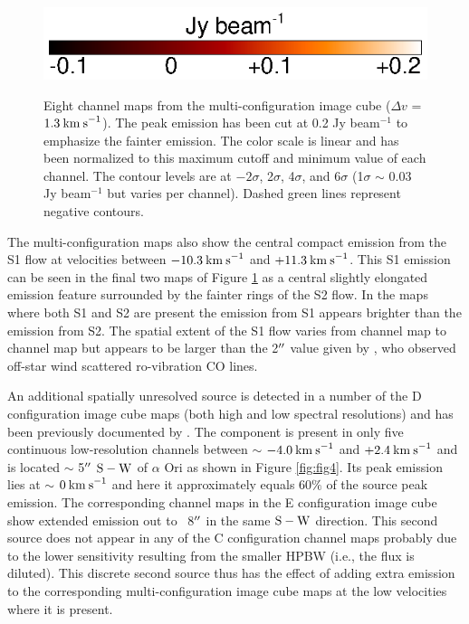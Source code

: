 \documentclass[iop]{emulateapj}
\begin{document}
\begin{figure}[hbt!]
{         }
\includegraphics[trim=0pt 20pt 0pt 5pt]{f11.ps}
\caption{Eight channel maps from the multi-configuration image cube ($\Delta v$ = $1.3\>{\rm km\>s}^{-1}$). The peak emission has been cut at 0.2 Jy beam${{}^{-1}}$ to emphasize the fainter emission. The color scale is linear and has been normalized to this maximum cutoff and minimum value of each channel. The contour levels are at $-2\sigma$, 2$\sigma$, 4$\sigma$, and 6$\sigma$ (1$\sigma$ $\sim$ 0.03 Jy beam$^{-1}$ but varies per channel). Dashed green lines represent negative contours.}
\label{fig:fig3}
\end{figure}

The multi-configuration maps also show the central compact emission from the S1 flow at velocities between $-10.3\>{\rm km\>s}^{-1}$ and $+11.3\>{\rm km\>s}^{-1}$. This S1 emission can be seen in the final two maps of Figure \ref{fig:fig3} as a central slightly elongated emission feature surrounded by the fainter rings of the S2 flow. In the maps where both S1 and S2 are present the emission from S1 appears brighter than the emission from S2. The spatial extent of the S1 flow varies from channel map to channel map but appears to be larger than the 2$\mbox{$^{\prime\prime}$}$ value given by \cite{2009AJ....137.3558S}, who observed off-star wind scattered ro-vibration CO lines. 

An additional spatially unresolved source is detected in a number of the D configuration image cube maps (both high and low spectral resolutions) and has been previously documented by \citet{2009AIPC.1094..868H}. The component is present in only five continuous low-resolution channels between $\sim$ $-4.0\>{\rm km\>s}^{-1}$ and $+2.4\>{\rm km\>s}^{-1}$ and is located $\sim$ 5$\mbox{$^{\prime\prime}$}$ $\rm{S-W}$ of $\alpha$ Ori as shown in Figure \ref{fig:fig4}. Its peak emission lies at $\sim$ $0\>{\rm km\>s}^{-1}$ and here it approximately equals 60$\%$ of the source peak emission. The corresponding channel maps in the E configuration image cube show extended emission out to ~8$\mbox{$^{\prime\prime}$}$ in the same $\rm{S-W}$ direction. This second source does not appear in any of the C configuration channel maps probably due to the lower sensitivity resulting from the smaller HPBW (i.e., the flux is diluted). This discrete second source thus has the effect of adding extra emission to the corresponding multi-configuration image cube maps at the low velocities where it is present.
\end{document}
